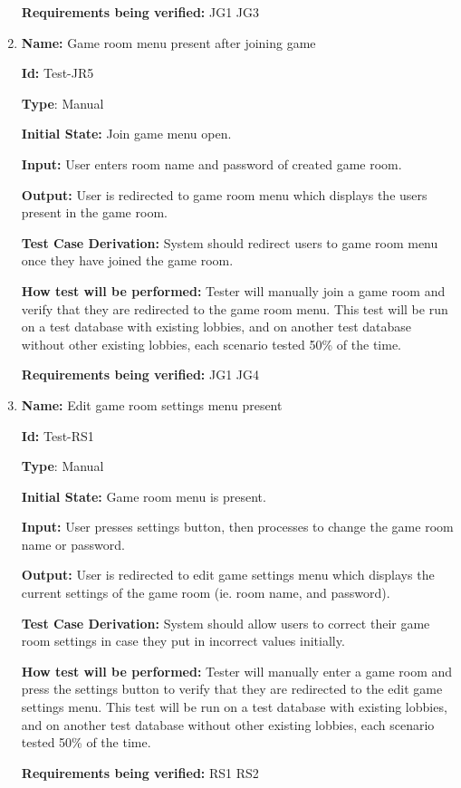 \documentclass[12pt, titlepage]{article}
\begin{document}
\begin{enumerate}
\textbf{Requirements being verified: }JG1 JG3

\item{\textbf{Name:} Game room menu present after joining game} \label{itm:Test-JR4}

\textbf{Id:} Test-JR5

\textbf{Type}: Manual

\textbf{Initial State:} Join game menu open.

\textbf{Input:} User enters room name and password of created game room. 

\textbf{Output:} User is redirected to game room menu which displays the users present in the game room.

\textbf{Test Case Derivation:} System should redirect users to game room menu once they have joined the game room.

\textbf{How test will be performed:} Tester will manually join a game room and verify that they are redirected to the game room menu. This test will be run on a test database with existing lobbies, and on another test database without other existing lobbies, each scenario tested 50\% of the time.

\textbf{Requirements being verified: }JG1 JG4

\item{\textbf{Name:} Edit game room settings menu present} \label{itm:Test-RS1}

\textbf{Id:} Test-RS1

\textbf{Type}: Manual

\textbf{Initial State:} Game room menu is present.

\textbf{Input:} User presses settings button, then processes to change the game room name or password.

\textbf{Output:} User is redirected to edit game settings menu which displays the current settings of the game room (ie. room name, and password).

\textbf{Test Case Derivation:} System should allow users to correct their game room settings in case they put in incorrect values initially.

\textbf{How test will be performed:} Tester will manually enter a game room and press the settings button to verify that they are redirected to the edit game settings menu. This test will be run on a test database with existing lobbies, and on another test database without other existing lobbies, each scenario tested 50\% of the time.

\textbf{Requirements being verified: } RS1 RS2


\end{enumerate}
\end{document}
